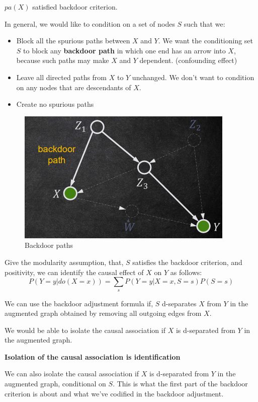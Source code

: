 \begin{note}
      $pa(X)$ satisfied backdoor criterion.
\end{note}

In general, we would like to condition on a set of nodes $S$ such that we:
\begin{itemize}
      \item Block all the spurious paths between $X$ and $Y$. We want the
            conditioning set $S$ to block any \textbf{backdoor path} in which
            one end has an arrow into $X$, because such paths may make $X$ and
            $Y$ dependent. (confounding effect)
      \item Leave all directed paths from $X$ to $Y$ unchanged. We don't want
            to condition on any nodes that are descendants of $X$.
      \item Create no spurious paths
\end{itemize}
\begin{figure}[!ht]
      \centering
      \includegraphics[width=\textwidth]{img/backdoor.png}
      \caption{Backdoor paths}
      \label{fig:backdoor}
\end{figure}
\begin{definition}
      Give the modularity assumption, that, $S$ satisfies the backdoor criterion,
      and positivity, we can identify the causal effect of $X$ on $Y$ as follows:
      \begin{equation}
            P(Y = y| do(X = x)) = \sum_{s} P(Y = y| X = x, S = s)P(S = s)
      \end{equation}
\end{definition}

We can use the backdoor adjustment formula if, $S$ d-separates $X$ from $Y$ in
the augmented graph obtained by removing all outgoing edges from $X$.

We would be able to isolate the causal association if $X$ is d-separated from
$Y$ in the augmented graph.
\begin{center}
      \textbf{Isolation of the causal association is identification}
\end{center}

We can also isolate the causal association if $X$ is d-separated from $Y$ in
the augmented graph, conditional on $S$. This is what the first part of the
backdoor criterion is about and what we've codified in the backdoor adjustment.